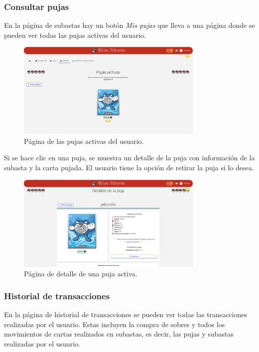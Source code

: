 \subsubsection{Consultar pujas}
En la página de subastas hay un botón \textit{Mis pujas} que lleva a una página donde se pueden ver todas las pujas activas del usuario.
\begin{figure}[H]
    \centering
    \includegraphics[width=0.8\textwidth]{figures/6-Analisis/6-Interfaz/interfaz/pujas-activas.png}
    \caption{Página de las pujas activas del usuario.}
    \label{fig:m-interfaz-mis-pujas}
\end{figure}

Si se hace clic en una puja, se muestra un detalle de la puja con información de la subasta y la carta pujada. 
El usuario tiene la opción de retirar la puja si lo desea.
\begin{figure}[H]
    \centering
    \includegraphics[width=0.8\textwidth]{figures/6-Analisis/6-Interfaz/interfaz/detalle-puja.png}
    \caption{Página de detalle de una puja activa.}
    \label{fig:m-interfaz-detalle-puja}
\end{figure}


\subsubsection{Historial de transacciones}
En la página de historial de transacciones se pueden ver todas las transacciones realizadas por el usuario.
Estas incluyen la compra de sobres y todos los movimientos de cartas realizados en subastas, es decir,
las pujas y subastas realizadas por el usuario.

